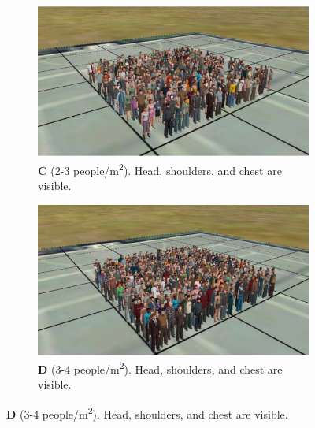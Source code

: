 \begin{figure}
  \begin{subfigure}[t]{0.45\textwidth}
    \centering
    \includegraphics[width=\textwidth]{Pictures/Figures/Los/C.png}
    \caption*{\textbf{C} (2-3 people/m\textsuperscript{2}). Head, shoulders, and chest are visible.}
  \end{subfigure}%
  \hspace{0.06\textwidth}
  \begin{subfigure}[t]{0.45\textwidth}
    \centering
    \includegraphics[width=\textwidth]{Pictures/Figures/Los/D.png}
    \caption*{\textbf{D} (3-4 people/m\textsuperscript{2}). Head, shoulders, and chest are visible.}
  \end{subfigure}


\end{figure}
